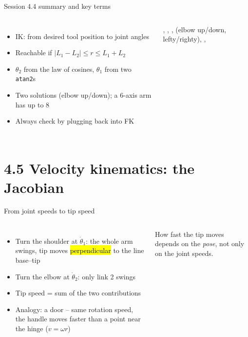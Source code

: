 \documentclass[aspectratio=169,10pt]{beamer}
\newcommand{\arm}[3]{%
  \draw[#3] (0,0) -- ++(#1:2.4) coordinate (E) -- ++(#1+#2:1.8) coordinate (T);
  \node[jnt] at (0,0) {}; \node[jnt] at (E) {}; \fill[mkOrange] (T) circle (1.6pt);}
\newcommand{\base}{\fill[pattern=north east lines,pattern color=mkGray] (-.35,-.25) rectangle (.35,-.08);
  \draw[mkGray,line width=.8pt] (-.35,-.08) -- (.35,-.08);}
\begin{document}
\begin{frame}[t]{Session 4.4 summary and key terms}
\begin{columns}[T,onlytextwidth]
\begin{itemize}\small
\item IK: from desired tool position to joint angles
\item Reachable if $|L_1-L_2|\le r\le L_1+L_2$
\item $\theta_2$ from the law of cosines, $\theta_1$ from two \texttt{atan2}s
\item Two solutions (elbow up/down); a 6-axis arm has up to 8
\item Always check by plugging back into FK
\end{itemize}
\begin{defbox}
\small
{}, , ,  (elbow up/down, lefty/righty), , 
\end{defbox}
\end{columns}
\end{frame}

\section{4.5 Velocity kinematics: the Jacobian}

\begin{frame}[t]{From joint speeds to tip speed}
\begin{columns}[T,onlytextwidth]
\begin{itemize}\small
\item Turn the shoulder at $\dot\theta_1$: the whole arm swings, tip moves \hl{perpendicular} to the line base--tip
\item Turn the elbow at $\dot\theta_2$: only link 2 swings
\item Tip speed = sum of the two contributions
\item Analogy: a door -- same rotation speed, the handle moves faster than a point near the hinge ($v=\omega r$)
\end{itemize}
\begin{notebox}
How fast the tip moves depends on the \emph{pose}, not only on the joint speeds.
\end{notebox}
\centering
{}
\end{columns}
\end{frame}
\end{document}
